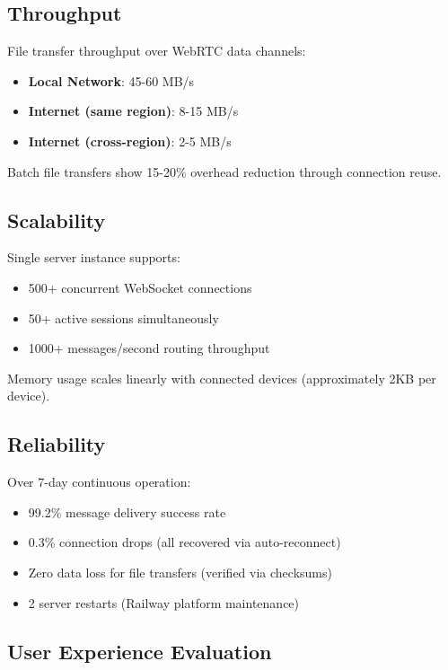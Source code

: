 \documentclass[conference]{IEEEtran}
\begin{document}
\subsection{Throughput}

File transfer throughput over WebRTC data channels:

\begin{itemize}
    \item \textbf{Local Network}: 45-60 MB/s
    \item \textbf{Internet (same region)}: 8-15 MB/s
    \item \textbf{Internet (cross-region)}: 2-5 MB/s
\end{itemize}

Batch file transfers show 15-20\% overhead reduction through connection reuse.

\subsection{Scalability}

Single server instance supports:
\begin{itemize}
    \item 500+ concurrent WebSocket connections
    \item 50+ active sessions simultaneously
    \item 1000+ messages/second routing throughput
\end{itemize}

Memory usage scales linearly with connected devices (approximately 2KB per device).

\subsection{Reliability}

Over 7-day continuous operation:
\begin{itemize}
    \item 99.2\% message delivery success rate
    \item 0.3\% connection drops (all recovered via auto-reconnect)
    \item Zero data loss for file transfers (verified via checksums)
    \item 2 server restarts (Railway platform maintenance)
\end{itemize}

\subsection{User Experience Evaluation}
\end{document}
